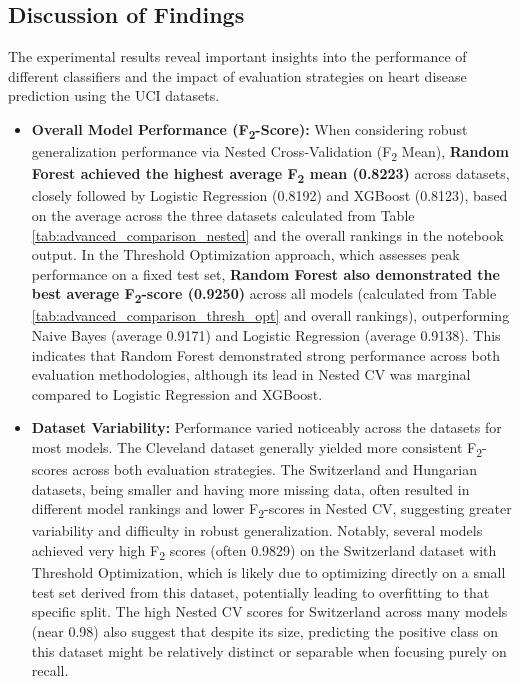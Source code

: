 \documentclass{article}
\begin{document}
\subsection{Discussion of Findings}
\label{sec:discussion} %

The experimental results reveal important insights into the performance of different classifiers and the impact of evaluation strategies on heart disease prediction using the UCI datasets.

\begin{itemize}
    \item \textbf{Overall Model Performance (F\textsubscript{2}-Score):} When considering robust generalization performance via Nested Cross-Validation (F\textsubscript{2} Mean), \textbf{Random Forest achieved the highest average F\textsubscript{2} mean (0.8223)} across datasets, closely followed by Logistic Regression (0.8192) and XGBoost (0.8123), based on the average across the three datasets calculated from Table \ref{tab:advanced_comparison_nested} and the overall rankings in the notebook output. In the Threshold Optimization approach, which assesses peak performance on a fixed test set, \textbf{Random Forest also demonstrated the best average F\textsubscript{2}-score (0.9250)} across all models (calculated from Table \ref{tab:advanced_comparison_thresh_opt} and overall rankings), outperforming Naive Bayes (average 0.9171) and Logistic Regression (average 0.9138). This indicates that Random Forest demonstrated strong performance across both evaluation methodologies, although its lead in Nested CV was marginal compared to Logistic Regression and XGBoost.
    \item \textbf{Dataset Variability:} Performance varied noticeably across the datasets for most models. The Cleveland dataset generally yielded more consistent F\textsubscript{2}-scores across both evaluation strategies. The Switzerland and Hungarian datasets, being smaller and having more missing data, often resulted in different model rankings and lower F\textsubscript{2}-scores in Nested CV, suggesting greater variability and difficulty in robust generalization. Notably, several models achieved very high F\textsubscript{2} scores (often 0.9829) on the Switzerland dataset with Threshold Optimization, which is likely due to optimizing directly on a small test set derived from this dataset, potentially leading to overfitting to that specific split. The high Nested CV scores for Switzerland across many models (near 0.98) also suggest that despite its size, predicting the positive class on this dataset might be relatively distinct or separable when focusing purely on recall.

\end{itemize}
\end{document}

